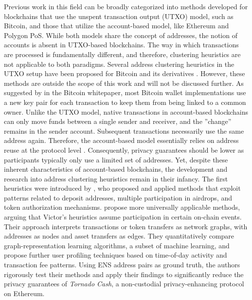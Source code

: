 \documentclass[12pt,a4paper,titlepage,oneside,english]{article}
\begin{document}
Previous work in this field can be broadly categorized into methods developed for blockchains that use the unspent transaction output (UTXO) model, such as Bitcoin, and those that utilize the account-based model, like Ethereum and Polygon PoS. 
While both models share the concept of addresses, the notion of accounts is absent in UTXO-based blockchains. The way in which transactions are processed is fundamentally different, and therefore, clustering heuristics are not applicable to both paradigms. \newline
Several address clustering heuristics in the UTXO setup have been proposed for Bitcoin and its derivatives \citep{Androulaki2013, Meiklejohn2013, Haslhofer2016, jourdan2018, kappos2022}. However, these methods are outside the scope of this work and will not be discussed further. \newline 
As suggested by \cite{nakamotoBitcoin2008} in the Bitcoin whitepaper, most Bitcoin wallet implementations use a new key pair for each transaction to keep them from being linked to a common owner. Unlike the UTXO model, native transactions in account-based blockchains can only move funds between a single sender and receiver, and the ''change'' remains in the sender account. Subsequent transactions necessarily use the same address again. Therefore, the account-based model essentially relies on address reuse at the protocol level \citep{Beres2020}. Consequently, privacy guarantees should be lower as participants typically only use a limited set of addresses. \newline
Yet, despite these inherent characteristics of account-based blockchains, the development and research into address clustering heuristics remain in their infancy. 
The first heuristics were introduced by \cite{FV:17}, who proposed and applied methods that exploit patterns related to deposit addresses, multiple participation in airdrops, and token authorization mechanisms. \newline
\cite{Beres2020} propose more universally applicable methods, arguing that Victor’s heuristics assume participation in certain on-chain events. Their approach interprets transactions or token transfers as network graphs, with addresses as nodes and asset transfers as edges. They quantitatively compare graph-representation learning algorithms, a subset of machine learning, and propose further user profiling techniques based on time-of-day activity and transaction fee patterns. Using ENS address pairs as ground truth, the authors rigorously test their methods and apply their findings to significantly reduce the privacy guarantees of \textit{Tornado Cash}, a non-custodial privacy-enhancing protocol on Ethereum. \newline
\end{document}

